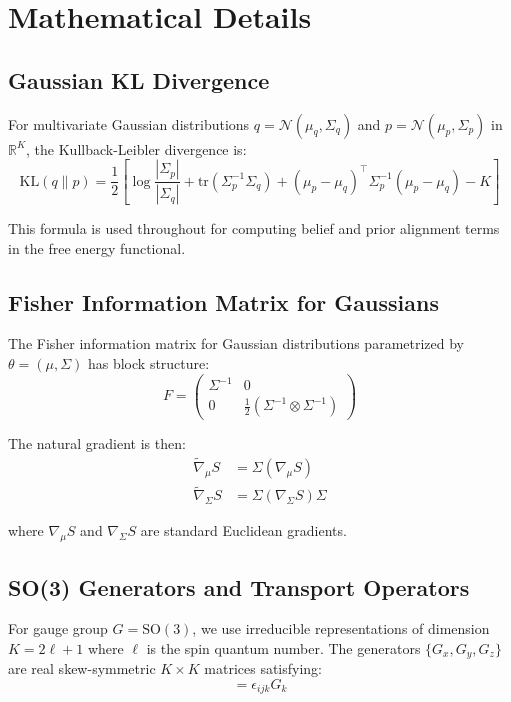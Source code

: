 \documentclass[11pt]{article}
\begin{document}
\section{Mathematical Details}
\label{app:math}

\subsection{Gaussian KL Divergence}

For multivariate Gaussian distributions $q = \mathcal{N}(\mu_q, \Sigma_q)$ and $p = \mathcal{N}(\mu_p, \Sigma_p)$ in $\mathbb{R}^K$, the Kullback-Leibler divergence is:
\begin{equation}
\mathrm{KL}(q \| p) = \frac{1}{2}\left[\log\frac{|\Sigma_p|}{|\Sigma_q|} + \mathrm{tr}(\Sigma_p^{-1}\Sigma_q) + (\mu_p - \mu_q)^\top\Sigma_p^{-1}(\mu_p - \mu_q) - K\right]
\end{equation}

This formula is used throughout for computing belief and prior alignment terms in the free energy functional.

\subsection{Fisher Information Matrix for Gaussians}

The Fisher information matrix for Gaussian distributions parametrized by $\theta = (\mu, \Sigma)$ has block structure:
\begin{equation}
F = \begin{pmatrix}
\Sigma^{-1} & 0 \\
0 & \frac{1}{2}(\Sigma^{-1} \otimes \Sigma^{-1})
\end{pmatrix}
\end{equation}

The natural gradient is then:
\begin{align}
\tilde{\nabla}_\mu S &= \Sigma (\nabla_\mu S) \\
\tilde{\nabla}_\Sigma S &= \Sigma (\nabla_\Sigma S) \Sigma
\end{align}

where $\nabla_\mu S$ and $\nabla_\Sigma S$ are standard Euclidean gradients.

\subsection{SO(3) Generators and Transport Operators}

For gauge group $G = \mathrm{SO}(3)$, we use irreducible representations of dimension $K = 2\ell + 1$ where $\ell$ is the spin quantum number. The generators $\{G_x, G_y, G_z\}$ are real skew-symmetric $K \times K$ matrices satisfying:
\begin{equation}
[G_i, G_j] = \epsilon_{ijk} G_k
\end{equation}
\end{document}
